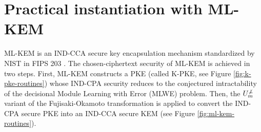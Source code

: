 \documentclass[journal=tches,submission]{iacrtrans}
\begin{document}
\section{Practical instantiation with ML-KEM}\label{sec:practical-instantiation-with-mlkem}
ML-KEM is an IND-CCA secure key encapsulation mechanism standardized by NIST in FIPS 203 \cite{FIPS203}. The chosen-ciphertext security of ML-KEM is achieved in two steps. First, ML-KEM constructs a PKE (called K-PKE, see Figure \ref{fig:k-pke-routines}) whose IND-CPA security reduces to the conjectured intractability of the decisional Module Learning with Error (MLWE) problem. Then, the $U^{\not\bot}_m$ variant of the Fujisaki-Okamoto transformation is applied to convert the IND-CPA secure PKE into an IND-CCA secure KEM (see Figure \ref{fig:ml-kem-routines}).

\begin{figure}[h]
    \centering


\end{figure}
\end{document}
